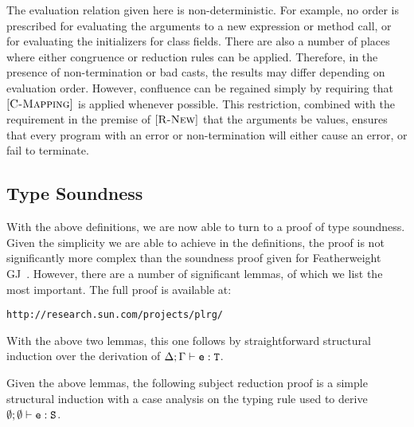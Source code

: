 \documentclass{acm-sigplan}
\begin{document}
The evaluation relation given here is non-deterministic. For example,
no order is prescribed for evaluating the arguments to a {\txt new}
expression or method call, or for evaluating the initializers for
class fields.  There are also a number of places where either
congruence or reduction rules can be applied.  Therefore, in the
presence of non-termination or bad casts, the results may differ
depending on evaluation order.  However, confluence can be regained
simply by requiring that $[{\textsc {C-Mapping}}]$ is applied whenever
possible.  This restriction, combined with the requirement in the
premise of $[{\textsc {R-New}}]$ that the arguments be values, ensures
that every program with an error or non-termination will either cause
an error, or fail to terminate.  

\figComp



\subsection{Type Soundness}
\label{proof}

With the above definitions, we are now able to turn to a proof of type
soundness. Given the simplicity we are able to achieve in the
definitions, the proof is not significantly more complex than the
soundness proof given for Featherweight GJ\ \cite{FJ}.  However, there
are a number of significant lemmas, of which we list the most
important. The full proof is available at:

\vspace{.1cm}
\verb|http://research.sun.com/projects/plrg/|

\fieldsPreservedLemma

\fieldsPreservedProof

\methodTypingLemma

\methodTypingProof

\substitutionPreservesTyping
\myProof With the above two lemmas, this one follows by
straightforward structural induction over the derivation of ${\Delta;\Gamma} \vdash {\ensuremath{{\mbox {\tt e}} : {\mbox {\tt T}}}}$.

\vspace{.3cm}

Given the above lemmas, the following subject reduction proof is a
simple structural induction with a case analysis on the typing rule
used to derive ${\emptyset;\emptyset} \vdash {\ensuremath {{\mbox {\tt e}} : {\mbox {\tt S}}}}$.

\preservation

\preservationProof
\end{document}
